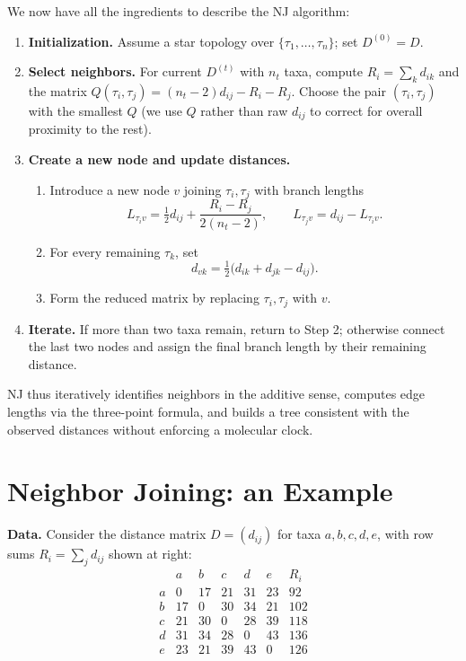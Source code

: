 We now have all the ingredients to describe the NJ algorithm:
\begin{enumerate}
  \item {\bf Initialization.} Assume a star topology over $\{\tau_1,\dots,\tau_n\}$; set $D^{(0)}=D$.
  \item {\bf Select neighbors.} For current $D^{(t)}$ with $n_t$ taxa, compute $R_i=\sum_k d_{ik}$ and the matrix $Q(\tau_i,\tau_j)=(n_t-2)d_{ij}-R_i-R_j$. Choose the pair $(\tau_i,\tau_j)$ with the smallest $Q$ (we use $Q$ rather than raw $d_{ij}$ to correct for overall proximity to the rest).
  \item {\bf Create a new node and update distances.}
    \begin{enumerate}
      \item Introduce a new node $v$ joining $\tau_i,\tau_j$ with branch lengths
      \[
      L_{\tau_i v}=\tfrac{1}{2}d_{ij}+\frac{R_i-R_j}{2(n_t-2)},\qquad
      L_{\tau_j v}=d_{ij}-L_{\tau_i v}.
      \]
      \item For every remaining $\tau_k$, set
      \[
      d_{vk}=\tfrac{1}{2}\bigl(d_{ik}+d_{jk}-d_{ij}\bigr).
      \]
      \item Form the reduced matrix by replacing $\tau_i,\tau_j$ with $v$.
    \end{enumerate}
  \item {\bf Iterate.} If more than two taxa remain, return to Step 2; otherwise connect the last two nodes and assign the final branch length by their remaining distance.
\end{enumerate}
NJ thus iteratively identifies neighbors in the additive sense, computes edge lengths via the three-point formula, and builds a tree consistent with the observed distances without enforcing a molecular clock.


\section{Neighbor Joining: an Example}

{\bf Data.} Consider the distance matrix $D=(d_{ij})$ for taxa $a,b,c,d,e$, with row sums $R_i=\sum_j d_{ij}$ shown at right:
\[
\begin{array}{c|ccccc|c}
   & a & b & c & d & e & R_i\\
\hline
a & 0 & 17 & 21 & 31 & 23 & 92\\
b & 17 & 0 & 30 & 34 & 21 & 102\\
c & 21 & 30 & 0 & 28 & 39 & 118\\
d & 31 & 34 & 28 & 0 & 43 & 136\\
e & 23 & 21 & 39 & 43 & 0 & 126\\
\end{array}
\]

